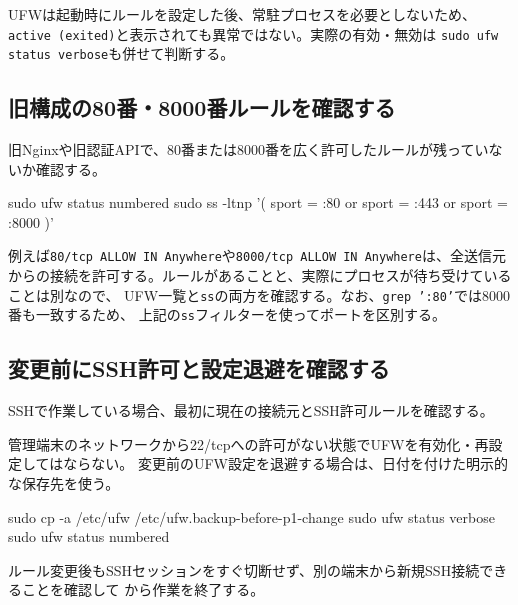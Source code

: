 \documentclass[uplatex,a4paper,11pt]{jsarticle}
\begin{document}
UFWは起動時にルールを設定した後、常駐プロセスを必要としないため、
\texttt{active (exited)}と表示されても異常ではない。実際の有効・無効は
\texttt{sudo ufw status verbose}も併せて判断する。

\subsection{旧構成の80番・8000番ルールを確認する}

旧Nginxや旧認証APIで、80番または8000番を広く許可したルールが残っていないか確認する。

\begin{command}
sudo ufw status numbered
sudo ss -ltnp '( sport = :80 or sport = :443 or sport = :8000 )'
\end{command}

例えば\texttt{80/tcp ALLOW IN Anywhere}や\texttt{8000/tcp ALLOW IN Anywhere}は、全送信元
からの接続を許可する。ルールがあることと、実際にプロセスが待ち受けていることは別なので、
UFW一覧と\texttt{ss}の両方を確認する。なお、\texttt{grep ':80'}では8000番も一致するため、
上記の\texttt{ss}フィルターを使ってポートを区別する。

\subsection{変更前にSSH許可と設定退避を確認する}

SSHで作業している場合、最初に現在の接続元とSSH許可ルールを確認する。


管理端末のネットワークから22/tcpへの許可がない状態でUFWを有効化・再設定してはならない。
変更前のUFW設定を退避する場合は、日付を付けた明示的な保存先を使う。

\begin{command}
sudo cp -a /etc/ufw /etc/ufw.backup-before-p1-change
sudo ufw status verbose
sudo ufw status numbered
\end{command}

ルール変更後もSSHセッションをすぐ切断せず、別の端末から新規SSH接続できることを確認して
から作業を終了する。
\end{document}
